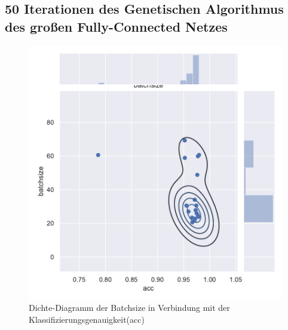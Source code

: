 \subsection{50 Iterationen des Genetischen Algorithmus des großen Fully-Connected Netzes}
\begin{figure}[H]
  \centering  
  \includegraphics[scale=0.5]{anhang/GA_50_mnist_digits_False_big_jointplot_batchsize.pdf}
  \caption{Dichte-Diagramm der Batchsize in Verbindung mit der Klassifizierungsgenauigkeit(acc)}
  
\end{figure}

